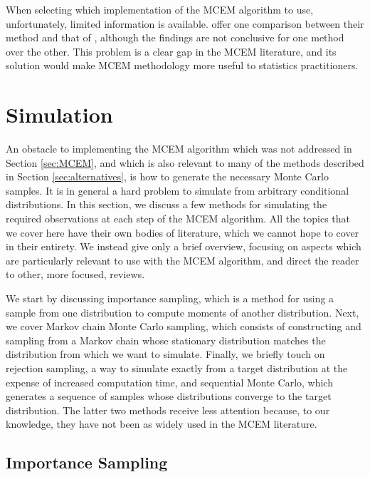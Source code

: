 \documentclass[11pt, oneside]{article}   	%
\begin{document}
When selecting which implementation of the MCEM algorithm to use, unfortunately, limited information is available. \citet{Caf05} offer one comparison between their method and that of \citet{Boo99}, although the findings are not conclusive for one method over the other. This problem is a clear gap in the MCEM literature, and its solution would make MCEM methodology more useful to statistics practitioners.


\section{Simulation}
\label{sec:simulation}

An obstacle to implementing the MCEM algorithm which was not addressed in Section \ref{sec:MCEM}, and which is also relevant to many of the methods described in Section \ref{sec:alternatives}, is how to generate the necessary Monte Carlo samples. It is in general a hard problem to simulate from arbitrary conditional distributions. In this section, we discuss a few methods for simulating the required observations at each step of the MCEM algorithm. All the topics that we cover here have their own bodies of literature, which we cannot hope to cover in their entirety. We instead give only a brief overview, focusing on aspects which are particularly relevant to use with the MCEM algorithm, and direct the reader to other, more focused, reviews.

We start by discussing importance sampling, which is a method for using a sample from one distribution to compute moments of another distribution. Next, we cover Markov chain Monte Carlo sampling, which consists of constructing and sampling from a Markov chain whose stationary distribution matches the distribution from which we want to simulate. Finally, we briefly touch on rejection sampling, a way to simulate exactly from a target distribution at the expense of increased computation time, and sequential Monte Carlo, which generates a sequence of samples whose distributions converge to the target distribution. The latter two methods receive less attention because, to our knowledge, they have not been as widely used in the MCEM literature.

\subsection{Importance Sampling}
\label{sec:imp_samp}
\end{document}
